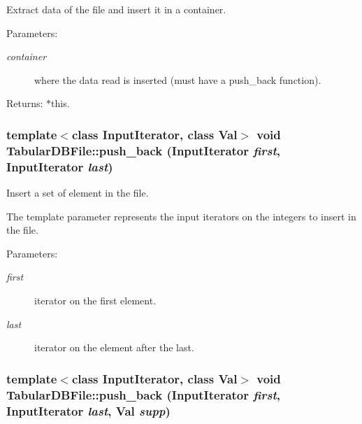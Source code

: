 Extract data of the file and insert it in a container. 

\begin{Desc}
\item[Parameters:]
\begin{description}
\item[{\em container}]where the data read is inserted (must have a push\_\-back function). \end{description}
\end{Desc}
\begin{Desc}
\item[Returns:]$\ast$this. \end{Desc}
\subsubsection{\setlength{\rightskip}{0pt plus 5cm}template$<$class Input\-Iterator, class Val$>$ void Tabular\-DBFile::push\_\-back (Input\-Iterator {\em first}, Input\-Iterator {\em last})\hspace{0.3cm}{\tt  [inline]}}\label{class_tabular_d_b_file_67bb4415de2083b4f4dc550f60e8bbf1}


Insert a set of element in the file. 

The template parameter represents the input iterators on the integers to insert in the file. \begin{Desc}
\item[Parameters:]
\begin{description}
\item[{\em first}]iterator on the first element. \item[{\em last}]iterator on the element after the last. \end{description}
\end{Desc}
\subsubsection{\setlength{\rightskip}{0pt plus 5cm}template$<$class Input\-Iterator, class Val$>$ void Tabular\-DBFile::push\_\-back (Input\-Iterator {\em first}, Input\-Iterator {\em last}, Val {\em supp})\hspace{0.3cm}{\tt  [inline]}}\label{class_tabular_d_b_file_3b938a6817ad2b62ece9f6697625252b}


